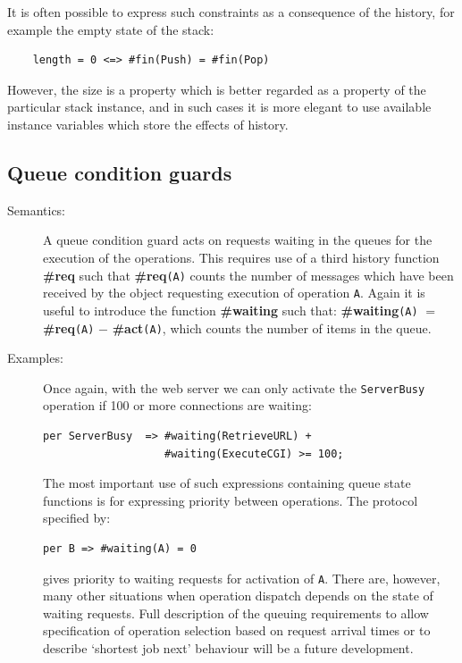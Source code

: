 \documentclass{overturerepchap}
\begin{document}
{\begin{description}
It is often possible to express such constraints as a
consequence of the history,
for example the empty state of the stack:
\begin{lstlisting}
    length = 0 <=> #fin(Push) = #fin(Pop)
\end{lstlisting}
However, the size is a property which is better regarded as a
property of the particular stack instance, and in such cases it is
more elegant to use available instance variables which store the effects
of history.

%
\end{description}


\subsection{Queue condition guards}\label{queuesec}
\begin{description}
\item[Semantics:]
A queue condition guard acts on requests waiting in the queues for the
execution of the operations.
This requires use of a third history function {\bf\ttfamily \#req} such that
{\bf\ttfamily \#req}{\tt (A)} counts the number of messages which have been received by the
object requesting execution of operation {\tt A}.
Again it is useful to introduce the function {\bf\ttfamily \#waiting} such that:
{\bf\ttfamily \#waiting}{\tt (A}{\tt )} $=$ {\bf\ttfamily \#req}{\tt (A}{\tt )} $-$ {\bf\ttfamily \#act}{\tt (A}{\tt )},
which counts the number of items in the queue.

\item[Examples:]
Once again, with the web server we can only activate the
\texttt{ServerBusy} operation if 100 or more connections are waiting:
\begin{lstlisting}
per ServerBusy  => #waiting(RetrieveURL) +
                   #waiting(ExecuteCGI) >= 100;
\end{lstlisting}

The most important use of such expressions containing queue
state functions is for expressing priority between operations. The
protocol specified by:
\begin{lstlisting}
per B => #waiting(A) = 0
\end{lstlisting}
gives priority to waiting  requests for activation of {\tt A}. There
are, however, many other situations when operation dispatch depends on
the state of waiting requests.  Full description of the queuing
requirements to allow specification of operation selection based on
request arrival times or to describe `shortest job next' behaviour
will be a future development.


\end{description}}
\end{document}
